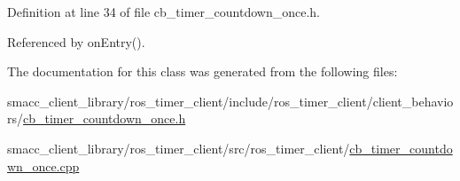 Definition at line 34 of file cb\+\_\+timer\+\_\+countdown\+\_\+once.\+h.



Referenced by on\+Entry().



The documentation for this class was generated from the following files\+:\begin{DoxyCompactItemize}
\item 
smacc\+\_\+client\+\_\+library/ros\+\_\+timer\+\_\+client/include/ros\+\_\+timer\+\_\+client/client\+\_\+behaviors/\hyperlink{cb__timer__countdown__once_8h}{cb\+\_\+timer\+\_\+countdown\+\_\+once.\+h}\item 
smacc\+\_\+client\+\_\+library/ros\+\_\+timer\+\_\+client/src/ros\+\_\+timer\+\_\+client/\hyperlink{cb__timer__countdown__once_8cpp}{cb\+\_\+timer\+\_\+countdown\+\_\+once.\+cpp}\end{DoxyCompactItemize}
